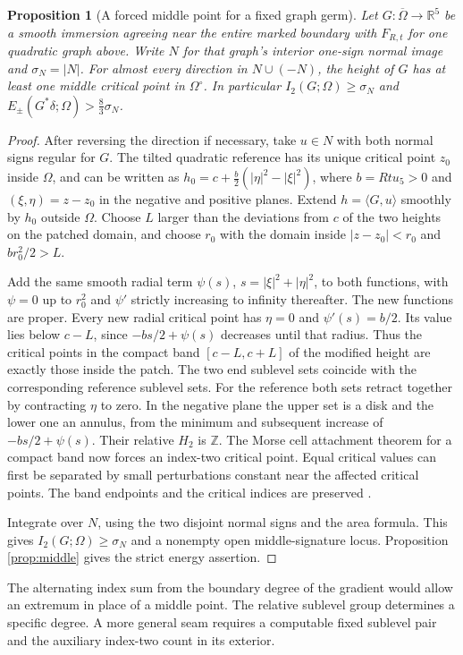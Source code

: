 \documentclass[11pt,letterpaper]{article}
\numberwithin{equation}{section}
\newtheorem{proposition}[theorem]{Proposition}
\newcommand{\R}{\mathbb R}
\begin{document}
\begin{proposition}[A forced middle point for a fixed graph germ]\label{prop:fixedgerm}
Let \(G:\overline\Omega\to\R^5\) be a smooth immersion agreeing
near the entire marked boundary with \(F_{R,t}\) for one
quadratic graph above. Write \(N\) for that graph's interior
one-sign normal image and \(\sigma_N=|N|\). For almost every
direction in \(N\cup(-N)\), the height of \(G\) has at least
one middle critical point in \(\Omega^\circ\). In particular
\(I_2(G;\Omega)\ge\sigma_N\) and
\(E_\pm(G^*\delta;\Omega)>\frac83\sigma_N\).
\end{proposition}
\begin{proof}
After reversing the direction if necessary, take \(u\in N\)
with both normal signs regular for \(G\). The tilted
quadratic reference has its unique critical point \(z_0\)
inside \(\Omega\), and can be written as
\(h_0=c+\frac b2(|\eta|^2-|\xi|^2)\), where \(b=Rt u_5>0\)
and \((\xi,\eta)=z-z_0\) in the negative and positive planes.
Extend \(h=\langle G,u\rangle\) smoothly by \(h_0\) outside
\(\Omega\). Choose \(L\) larger than the deviations from
\(c\) of the two heights on the patched domain, and choose
\(r_0\) with the domain inside \(|z-z_0|<r_0\) and
\(br_0^2/2>L\).

Add the same smooth radial term \(\psi(s)\),
\(s=|\xi|^2+|\eta|^2\), to both functions, with \(\psi=0\)
up to \(r_0^2\) and \(\psi'\) strictly increasing to infinity
thereafter. The new functions are proper. Every new radial
critical point has \(\eta=0\) and \(\psi'(s)=b/2\). Its value
lies below \(c-L\), since \(-bs/2+\psi(s)\) decreases until
that radius. Thus the critical points in the compact band
\([c-L,c+L]\) of the modified height are exactly those
inside the patch. The two end sublevel sets coincide with
the corresponding reference sublevel sets. For the reference
both sets retract together by contracting \(\eta\) to zero.
In the negative plane the upper set is a disk and the lower
one an annulus, from the minimum and subsequent increase of
\(-bs/2+\psi(s)\). Their relative \(H_2\) is \(\mathbb Z\).
The Morse cell attachment theorem for a compact band now
forces an index-two critical point. Equal critical values
can first be separated by small perturbations constant near
the affected critical points. The band endpoints and the
critical indices are preserved
\cite[Theorems 3.1--3.2 and Remark~3.3]{Milnor1963MorseTheory}.

Integrate over \(N\), using the two disjoint normal signs and
the area formula. This gives \(I_2(G;\Omega)\ge\sigma_N\)
and a nonempty open middle-signature locus. Proposition
\ref{prop:middle} gives the strict energy assertion.
\end{proof}
The alternating index sum from the boundary degree of the
gradient would allow an extremum in place of a middle point.
The relative sublevel group determines a specific degree.
A more general seam requires a computable fixed sublevel
pair and the auxiliary index-two count in its exterior.
\end{document}
